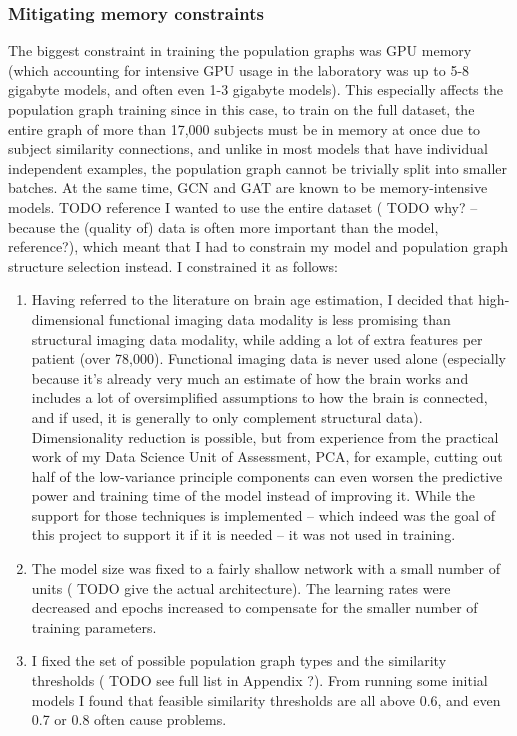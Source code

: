 \subsubsection{Mitigating memory constraints}
The biggest constraint in training the population graphs was GPU memory (which accounting for intensive GPU usage in the laboratory was up to 5-8 gigabyte models, and often even 1-3 gigabyte models). This especially affects the population graph training since in this case, to train on the full dataset, the entire graph of more than 17,000 subjects must be in memory at once due to subject similarity connections, and unlike in most models that have individual independent examples, the population graph cannot be trivially split into smaller batches. At the same time, GCN and GAT are known to be memory-intensive models.
TODO reference
I wanted to use the entire dataset (
TODO why? – because the (quality of) data is often more important than the model, reference?),
which meant that I had to constrain my model and population graph structure selection instead. I constrained it as follows:
\begin{enumerate}
    \item Having referred to the literature on brain age estimation, I decided that high-dimensional functional imaging data modality is less promising than structural imaging data modality, while adding a lot of extra features per patient (over 78,000). Functional imaging data is never used alone (especially because it's already very much an estimate of how the brain works and includes a lot of oversimplified assumptions to how the brain is connected, and if used, it is generally to only complement structural data). Dimensionality reduction is possible, but from experience from the practical work of my Data Science Unit of Assessment, PCA, for example, cutting out half of the low-variance principle components can even worsen the predictive power and training time of the model instead of improving it. While the support for those techniques is implemented – which indeed was the goal of this project to support it if it is needed – it was not used in training.
    \item The model size was fixed to a fairly shallow network with a small number of units (
        TODO give the actual architecture). 
        The learning rates were decreased and epochs increased to compensate for the smaller number of training parameters.
    \item I fixed the set of possible population graph types and the similarity thresholds (
    TODO see full list in Appendix ?). 
    From running some initial models I found that feasible similarity thresholds are all above 0.6, and even 0.7 or 0.8 often cause problems. 
\end{enumerate}


